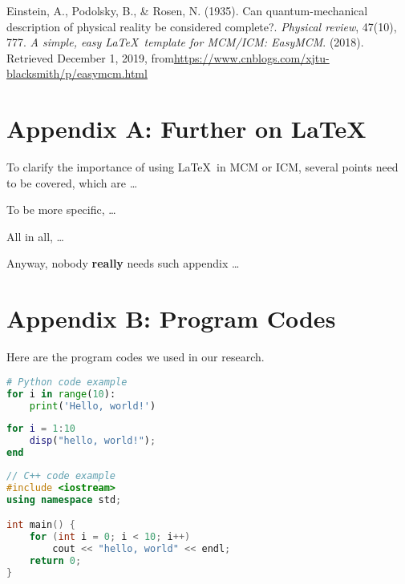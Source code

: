 \documentclass[12pt]{article}  %
\begin{document}
\begin{thebibliography}{99}
 Einstein, A., Podolsky, B., \& Rosen, N. (1935). Can quantum-mechanical description of physical reality be considered complete?. \emph{Physical review}, 47(10), 777.
 \emph{A simple, easy \LaTeX\ template for MCM/ICM: EasyMCM}. (2018). Retrieved December 1, 2019, from\url{https://www.cnblogs.com/xjtu-blacksmith/p/easymcm.html}
\end{thebibliography}


\begin{subappendices}  %

\section{Appendix A: Further on \LaTeX}
To clarify the importance of using \LaTeX\ in MCM or ICM, several points need to be covered, which are \ldots

To be more specific, \ldots

All in all, \ldots

Anyway, nobody \textbf{really} needs such appendix \ldots

\section{Appendix B: Program Codes}
Here are the program codes we used in our research.


\begin{lstlisting}[language=Python, name={test.py}]
# Python code example
for i in range(10):
    print('Hello, world!')
\end{lstlisting}

\begin{lstlisting}[language=MATLAB, name={test.m}]
% MATLAB code example
for i = 1:10
    disp("hello, world!");
end
\end{lstlisting}

\begin{lstlisting}[language=C++, name={test.cpp}]
// C++ code example
#include <iostream>
using namespace std;

int main() {
    for (int i = 0; i < 10; i++)
        cout << "hello, world" << endl;
    return 0;
}
\end{lstlisting}

\end{subappendices}  %
\end{document}
